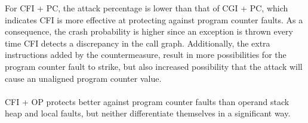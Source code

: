 %
For CFI + PC, the attack percentage is lower than that of CGI + PC, which indicates CFI is more effective at protecting against program counter faults. As a consequence, the crash probability is higher since an exception is thrown every time CFI detects a discrepancy in the call graph. Additionally, the extra instructions added by the countermeasure, result in more possibilities for the program counter fault to strike, but also increased possibility that the attack will cause an unaligned program counter value.\\\\
%
CFI + OP protects better against program counter faults than operand stack heap and local faults, but neither differentiate themselves in a significant way.